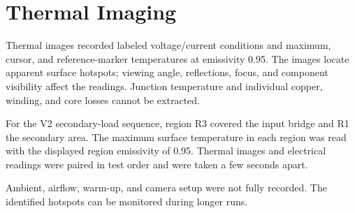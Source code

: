 \section{Thermal Imaging}
\label{sec:method-thermal}

Thermal images recorded labeled voltage/current conditions and maximum,
cursor, and reference-marker temperatures at emissivity 0.95. The images
locate apparent surface hotspots; viewing angle, reflections, focus, and
component visibility affect the readings. Junction temperature and individual
copper, winding, and core losses cannot be extracted.

For the V2 secondary-load sequence, region R3 covered the input bridge and
R1 the secondary area. The maximum surface temperature in each region was
read with the displayed region emissivity of 0.95. Thermal images and
electrical readings were paired in test order and were taken a few seconds
apart.

Ambient, airflow, warm-up, and camera setup were not fully recorded.
The identified hotspots can be monitored during longer runs.

